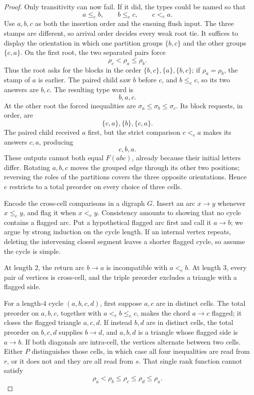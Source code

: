 \documentclass[11pt]{article}
\theoremstyle{definition}
\begin{document}
\begin{proof}
Only transitivity can now fail.  If it did, the types could be named so that
\[
  a\le_e b,\qquad b\le_e c,\qquad c<_e a.
\]
Use \(a,b,c\) as both the insertion order and the ensuing flush input.  The
three stamps are different, so arrival order decides every weak root tie.
It suffices to display the orientation in which one partition groups
\(\{b,c\}\) and the other groups \(\{c,a\}\).  On the first root, the two
separated pairs force
\[
  \rho_c<\rho_a\le\rho_b.
\]
Thus the root asks for the blocks in the order
\(\{b,c\},\{a\},\{b,c\}\); if \(\rho_a=\rho_b\), the stamp of \(a\) is
earlier.  The paired child saw \(b\) before \(c\), and \(b\le_e c\), so its
two answers are \(b,c\).  The resulting type word is
\[
  b,a,c.
\]
At the other root the forced inequalities are
\(\sigma_a\le\sigma_b\le\sigma_c\).  Its block requests, in order, are
\[
  \{c,a\},\{b\},\{c,a\}.
\]
The paired child received \(a\) first, but the strict comparison
\(c<_e a\) makes its answers \(c,a\), producing
\[
  c,b,a.
\]
These outputs cannot both equal \(F(abc)\), already because their initial
letters differ.  Rotating \(a,b,c\) moves the grouped edge through its other
two positions; reversing the roles of the partitions covers the three
opposite orientations.  Hence \(e\) restricts to a total preorder on every
choice of three cells.

Encode the cross-cell comparisons in a digraph \(G\).  Insert an arc
\(x\to y\) whenever \(x\le_e y\), and flag it when \(x<_e y\).  Consistency
amounts to showing that no cycle contains a flagged arc.  Put a hypothetical
flagged arc first and call it \(a\to b\); we argue by strong induction on
the cycle length.  If an internal vertex repeats, deleting the intervening
closed segment leaves a shorter flagged cycle, so assume the cycle is
simple.

At length \(2\), the return arc \(b\to a\) is incompatible with
\(a<_e b\).  At length \(3\), every pair of vertices is cross-cell, and the
triple preorder excludes a triangle with a flagged side.

For a length-\(4\) cycle \((a,b,c,d)\), first suppose \(a,c\) are in
distinct cells.  The total preorder on \(a,b,c\), together with
\(a<_e b\le_e c\), makes the chord \(a\to c\) flagged; it closes the
flagged triangle \(a,c,d\).  If instead \(b,d\) are in distinct cells, the total
preorder on \(b,c,d\) supplies \(b\to d\), and \(a,b,d\) is a triangle
whose flagged side is \(a\to b\).  If both diagonals are intra-cell, the
vertices alternate between two cells.  Either \(P\) distinguishes those
cells, in which case all four inequalities are read from \(r\), or it does
not and they are all read from \(s\).  That single rank function cannot
satisfy
\[
  \rho_a<\rho_b\le\rho_c\le\rho_d\le\rho_a.
\]


\end{proof}
\end{document}
